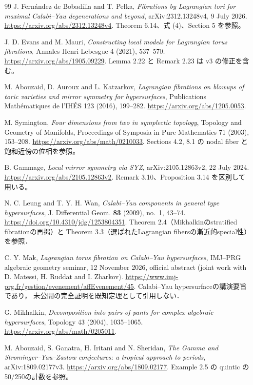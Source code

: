 \documentclass[11pt,a4paper]{article}
\theoremstyle{definition}
\begin{document}
\begin{thebibliography}{99}
J. Fernández de Bobadilla and T. Pełka,
\emph{Fibrations by Lagrangian tori for maximal Calabi--Yau degenerations and beyond},
arXiv:2312.13248v4, 9 July 2026.
\url{https://arxiv.org/abs/2312.13248v4}.
Theorem 6.14、式 (4)、Section 5 を参照。

J. D. Evans and M. Mauri,
\emph{Constructing local models for Lagrangian torus fibrations},
Annales Henri Lebesgue 4 (2021), 537--570.
\url{https://arxiv.org/abs/1905.09229}.
Lemma 2.22 と Remark 2.23 は v3 の修正を含む。

M. Abouzaid, D. Auroux and L. Katzarkov,
\emph{Lagrangian fibrations on blowups of toric varieties and mirror symmetry for hypersurfaces},
Publications Mathématiques de l'IHÉS 123 (2016), 199--282.
\url{https://arxiv.org/abs/1205.0053}.

M. Symington,
\emph{Four dimensions from two in symplectic topology},
Topology and Geometry of Manifolds, Proceedings of Symposia in Pure Mathematics 71 (2003), 153--208.
\url{https://arxiv.org/abs/math/0210033}.
Sections 4.2, 8.1 の nodal fiber と飽和近傍の位相を参照。

B. Gammage, \emph{Local mirror symmetry via SYZ}, arXiv:2105.12863v2, 22 July 2024.
\url{https://arxiv.org/abs/2105.12863v2}.
Remark 3.10、Proposition 3.14 を区別して用いる。

N. C. Leung and T. Y. H. Wan,
\emph{Calabi--Yau components in general type hypersurfaces},
J. Differential Geom. \textbf{83} (2009), no.~1, 43--74.
\url{https://doi.org/10.4310/jdg/1253804351}.
Theorem 2.4（Mikhalkinのstratified fibrationの再掲）と
Theorem 3.3（選ばれたLagrangian fibersの漸近的special性）を参照．

C. Y. Mak,
\emph{Lagrangian torus fibration on Calabi--Yau hypersurfaces},
IMJ--PRG algebraic geometry seminar, 12 November 2026,
official abstract (joint work with D. Matessi, H. Ruddat and I. Zharkov).
\url{https://www.imj-prg.fr/gestion/evenement/affEvenement/45}.
Calabi--Yau hypersurfaceの講演要旨であり，
未公開の完全証明を既知定理として引用しない．

G. Mikhalkin,
\emph{Decomposition into pairs-of-pants for complex algebraic hypersurfaces},
Topology 43 (2004), 1035--1065.
\url{https://arxiv.org/abs/math/0205011}.

M. Abouzaid, S. Ganatra, H. Iritani and N. Sheridan,
\emph{The Gamma and Strominger--Yau--Zaslow conjectures: a tropical approach to periods},
arXiv:1809.02177v3.
\url{https://arxiv.org/abs/1809.02177}.
Example 2.5 の quintic の50/250の計数を参照。


\end{thebibliography}
\end{document}
